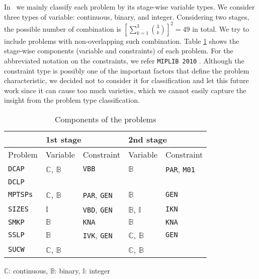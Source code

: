 In \siplibtwo\, we mainly classify each problem by its stage-wise variable types. We consider three types of variable: continuous, binary, and integer. Considering two stages, the possible number of combination is $\left[\sum_{k=1}^3\binom{3}{k}\right]^2=49$ in total. We try to include problems with non-overlapping such combination. Table \ref{table:prob_class} shows the stage-wise components (variable and constraints) of each problem. For the abbreviated notation on the constraints, we refer \texttt{MIPLIB 2010} \cite{MIPLIB}. Although the constraint type is possibly one of the important factors that define the problem characteristic, we decided not to consider it for classification and let this future work since it can cause too much varieties, which we cannot easily capture the insight from the problem type classification. 
\begin{table}[H]
	\centering
	\caption{Components of the problems}
	\label{table:prob_class}
	\begin{threeparttable}
		\begin{tabular}{@{}lllll@{}}
			\toprule
			& \multicolumn{2}{l}{1st stage}                              				  	& \multicolumn{2}{l}{2nd stage}                             			        \\ \midrule
			Problem 	     & Variable                    & Constraint                   	& Variable                    & Constraint                  				    \\ \midrule
			\texttt{DCAP}    & $\mathbb{C}$, $\mathbb{B}$  & \texttt{VBB}                	& $\mathbb{B}$                & \texttt{PAR}, \texttt{M01} 			    		\\
			\texttt{DCLP}	 &							   &								& 			 	  &													\\				
			\texttt{MPTSPs}  & $\mathbb{C}$, $\mathbb{B}$  & \texttt{PAR}, \texttt{GEN}		& $\mathbb{B}$                & \texttt{GEN}               						\\
			\texttt{SIZES}   & $\mathbb{I}$ 			   & \texttt{VBD}, \texttt{GEN} 	& $\mathbb{B}$, $\mathbb{I}$  & \texttt{IKN}             						\\
			\texttt{SMKP}    & $\mathbb{B}$                & \texttt{KNA}                	& $\mathbb{B}$                & \texttt{KNA}              						\\
			\texttt{SSLP}    & $\mathbb{B}$                & \texttt{IVK}, \texttt{GEN} 	& $\mathbb{C}$, $\mathbb{B}$  & \texttt{GEN}             						\\
			\texttt{SUCW}    & $\mathbb{C}$, $\mathbb{B}$                 &                              	& $\mathbb{C}$, $\mathbb{B}$  &                             					\\ \bottomrule
		\end{tabular}
		
		\begin{tablenotes}
			\small
			\item $\mathbb{C}$: continuous, $\mathbb{B}$: binary, $\mathbb{I}$: integer
		\end{tablenotes}
	\end{threeparttable}
\end{table}

